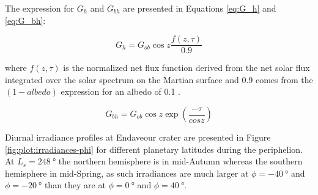 The expression for $G_{h}$ and $G_{bh}$ are presented in Equations \ref{eq:G_h} and \ref{eq:G_bh}:

\begin{equation}
  \label{eq:G_h_2}
  G_{h} = G_{ob}\cos{z}\frac{f(z,\tau)}{0.9}
\end{equation}

where $f(z,\tau)$ is the normalized net flux function derived from the net solar flux integrated over the solar spectrum on the Martian surface and 0.9 comes from the $(1-albedo)$ expression for an albedo of 0.1 .

\begin{equation}
  \label{eq:G_bh}
  G_{bh} = G_{ob}\cos{z}\exp(\frac{-\tau}{cos{z}})
\end{equation}

Diurnal irradiance profiles at Endaveour crater are presented in Figure \ref{fig:plot:irradiances-phi} for different planetary latitudes during the periphelion. At $L_{s} = \SI{248}{\degree}$ the northern hemisphere is in mid-Autumn whereas the southern hemisphere in mid-Spring, as such irradiances are much larger at $\phi = \SI{-40}{\degree}$ and $\phi = \SI{-20}{\degree}$ than they are at $\phi = \SI{0}{\degree}$ and $\phi = \SI{40}{\degree}$.

